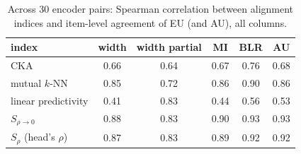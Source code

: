 \begin{table}[h]
\centering
\caption{Across 30 encoder pairs: Spearman correlation between alignment indices and item-level agreement of EU (and AU), all columns.}
\label{tab:srhofull}
\small
\begin{tabular}{lccccc}
\toprule
index & width & width partial & MI & BLR & AU \\
\midrule
CKA & 0.66 & 0.64 & 0.67 & 0.76 & 0.68 \\
mutual $k$-NN & 0.85 & 0.72 & 0.86 & 0.90 & 0.86 \\
linear predictivity & 0.41 & 0.83 & 0.44 & 0.56 & 0.53 \\
$S_{\rho\to0}$ & 0.88 & 0.83 & 0.90 & 0.93 & 0.93 \\
$S_\rho$ (head's $\rho$) & 0.87 & 0.83 & 0.89 & 0.92 & 0.92 \\
\bottomrule
\end{tabular}
\end{table}